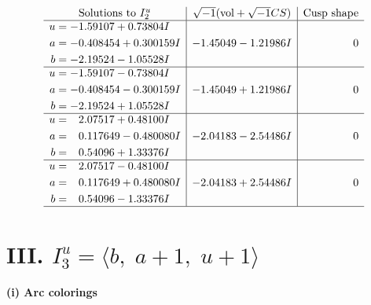 \documentclass[1p]{elsarticle_modified}
\theoremstyle{definition}
\newcommand{\I}{\sqrt{-1}}
\begin{document}
$$\begin{array}{c|c|c}
\text{Solutions to }I^u_{2}& \I (\text{vol} + \sqrt{-1}CS) & \text{Cusp shape}\\
 \hline 
\begin{aligned}
u &= -1.59107 + 0.73804 I \\
a &= -0.408454 + 0.300159 I \\
b &= -2.19524 - 1.05528 I\end{aligned}
 & -1.45049 - 1.21986 I & \phantom{-0.000000 } 0 \\ \hline\begin{aligned}
u &= -1.59107 - 0.73804 I \\
a &= -0.408454 - 0.300159 I \\
b &= -2.19524 + 1.05528 I\end{aligned}
 & -1.45049 + 1.21986 I & \phantom{-0.000000 } 0 \\ \hline\begin{aligned}
u &= \phantom{-}2.07517 + 0.48100 I \\
a &= \phantom{-}0.117649 - 0.480080 I \\
b &= \phantom{-}0.54096 + 1.33376 I\end{aligned}
 & -2.04183 - 2.54486 I & \phantom{-0.000000 } 0 \\ \hline\begin{aligned}
u &= \phantom{-}2.07517 - 0.48100 I \\
a &= \phantom{-}0.117649 + 0.480080 I \\
b &= \phantom{-}0.54096 - 1.33376 I\end{aligned}
 & -2.04183 + 2.54486 I & \phantom{-0.000000 } 0\\
 \hline 
 \end{array}$$\newpage\newpage\renewcommand{\arraystretch}{1}
\centering \section*{III. $I^u_{3}= \langle b,\;a+1,\;u+1 \rangle$}
\flushleft \textbf{(i) Arc colorings}\\
\end{document}
